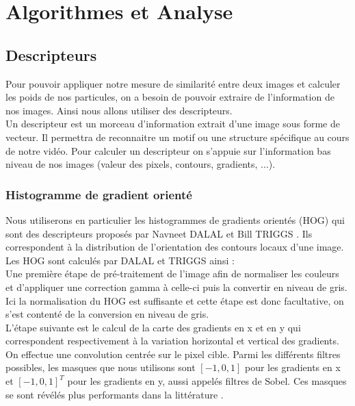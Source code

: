 \chapter{Algorithmes et Analyse}




\section{Descripteurs}
Pour pouvoir appliquer notre mesure de similarité entre deux images et calculer les poids de nos particules, on a besoin de pouvoir extraire de l'information de nos images. Ainsi nous allons utiliser des descripteurs. \\
Un descripteur est un morceau d'information extrait d'une image sous forme de vecteur. Il permettra de reconnaitre un motif ou une structure spécifique au cours de notre vidéo. Pour calculer un descripteur on s'appuie sur l'information bas niveau de nos images (valeur des pixels, contours, gradients, ...).

\subsection{Histogramme de gradient orienté}

Nous utiliserons en particulier les histogrammes de gradients orientés (HOG) qui sont des descripteurs proposés par Navneet DALAL et Bill TRIGGS \cite{dalal_histograms_2005}. Ils correspondent à la distribution de l'orientation des contours locaux d'une image. \\

Les HOG sont calculés par DALAL et TRIGGS ainsi : \\

Une première étape de pré-traitement de l'image afin de normaliser les couleurs et d'appliquer une correction gamma à celle-ci puis la convertir en niveau de gris. Ici la normalisation du HOG est suffisante et cette étape est donc facultative, on s'est contenté de la conversion en niveau de gris. \\

L'étape suivante est le calcul de la carte des gradients en x et en y qui correspondent respectivement à la variation horizontal et vertical des gradients. On effectue une convolution centrée sur le pixel cible. Parmi les différents filtres possibles, les masques que nous utilisons sont $[-1, 0, 1]$ pour les gradients en x et $[-1, 0, 1]^{T}$ pour les gradients en y, aussi appelés filtres de Sobel. Ces masques se sont révélés plus performants dans la littérature \cite{dalal_histograms_2005}.\\

